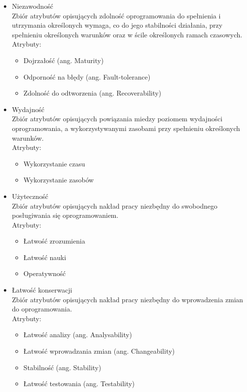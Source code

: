 \documentclass[a4paper]{article}
\begin{document}
\begin{itemize}
    \item Niezawodność\\
Zbiór atrybutów opisujących zdolność
oprogramowania do spełnienia i utrzymania
określonych wymaga, co do jego stabilności
działania, przy spełnieniu określonych
warunków oraz w ścile określonych ramach
czasowych.\\
Atrybuty:
    \begin{itemize}
          \item Dojrzałość (ang. Maturity)
          \item Odporność na błędy (ang. Fault-tolerance)
          \item Zdolność do odtworzenia (ang. Recoverability)
    \end{itemize}
    \item Wydajność\\
Zbiór atrybutów opisujących powiązania miedzy
poziomem wydajności oprogramowania, a
wykorzystywanymi zasobami przy spełnieniu określonych
warunków.\\
Atrybuty:
    \begin{itemize}
        \item Wykorzystanie czasu
        \item Wykorzystanie zasobów
    \end{itemize}
    \item Użyteczność\\
Zbiór atrybutów opisujących nakład pracy
niezbędny do swobodnego posługiwania się
oprogramowaniem.\\
Atrybuty:
    \begin{itemize}
        \item Łatwość zrozumienia
        \item Łatwość nauki
        \item Operatywność
    \end{itemize}
    \item Łatwość konserwacji\\
Zbiór atrybutów opisujących nakład pracy
niezbędny do wprowadzenia zmian do
oprogramowania.\\
Atrybuty:
    \begin{itemize}
        \item Łatwość analizy (ang. Analysability)
        \item Łatwość wprowadzania zmian (ang. Changeability)
        \item Stabilność (ang. Stability)
        \item Łatwość testowania (ang. Testability)

\end{itemize}
\end{itemize}
\end{document}
